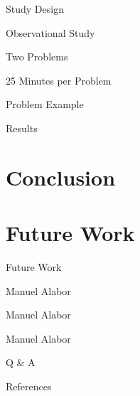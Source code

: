 \documentclass[aspectratio=169]{beamer}
\begin{document}
\begin{frame}{Study Design}
    \begin{vfilleditems}
        \item Observational Study
        \item Two Problems
        \item 25 Minutes per Problem
        \item 
    \end{vfilleditems}
\end{frame}

\begin{frame}{Problem Example}

\end{frame}

\begin{frame}{Results}

\end{frame}

\section{Conclusion}
\begin{frame}{}

\end{frame}

\section{Future Work}
\begin{frame}[fragile]{Future Work}
    \begin{vfilleditems}
        \item Manuel Alabor \cite{10.1145/2501654.2501666}
        \item Manuel Alabor
        \item Manuel Alabor
    \end{vfilleditems}
\end{frame}

\begin{frame}
  \centering
  \vfill
  {\fontsize{40}{50}\selectfont Q \& A}
  \vfill
\end{frame}

\appendix
\begin{frame}[allowframebreaks]{References}
	\printbibliography
\end{frame}
\end{document}
